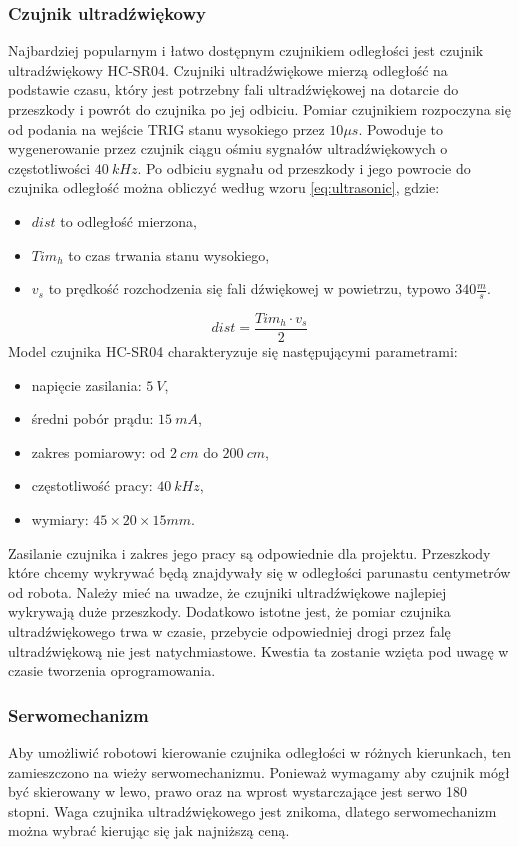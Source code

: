 \documentclass[11pt]{article}
\begin{document}
\subsubsection{Czujnik ultradźwiękowy}
Najbardziej popularnym i łatwo dostępnym czujnikiem odległości jest czujnik ultradźwiękowy HC-SR04.
Czujniki ultradźwiękowe mierzą odległość na podstawie czasu, który jest potrzebny fali ultradźwiękowej na dotarcie do przeszkody i powrót do czujnika po jej odbiciu.
Pomiar czujnikiem rozpoczyna się od podania na wejście TRIG stanu wysokiego przez $ 10 \mu s $. Powoduje to wygenerowanie przez czujnik ciągu ośmiu sygnałów ultradźwiękowych o częstotliwości $ 40\ kHz $. Po odbiciu sygnału od przeszkody i jego powrocie do czujnika odległość można obliczyć według wzoru \ref{eq:ultrasonic}, gdzie:

\begin{itemize}
	\item $ dist $ to odległość mierzona,
	\item $ Tim_h $ to czas trwania stanu wysokiego, 
	\item $ v_s $ to prędkość rozchodzenia się fali dźwiękowej w powietrzu, typowo $ 340 \frac{m}{s} $.
\end{itemize}
\begin{equation}
\label{eq:ultrasonic}
	dist = \frac{Tim_h \cdot v_s}{2}
\end{equation}
Model czujnika HC-SR04 charakteryzuje się następującymi parametrami:
\begin{itemize}
	\item napięcie zasilania: $ 5\ V $,
	\item średni pobór prądu: $ 15\ mA $,
	\item zakres pomiarowy: od $ 2\ cm $ do $ 200\ cm $,
	\item częstotliwość pracy: $ 40\ kHz $,
	\item wymiary: $ 45 \times 20 \times 15 mm $.
\end{itemize}
Zasilanie czujnika i zakres jego pracy są odpowiednie dla projektu.
Przeszkody które chcemy wykrywać będą znajdywały się w odległości parunastu centymetrów od robota.
Należy mieć na uwadze, że czujniki ultradźwiękowe najlepiej wykrywają duże przeszkody. 
Dodatkowo istotne jest, że pomiar czujnika ultradźwiękowego trwa w czasie, przebycie odpowiedniej drogi przez falę ultradźwiękową nie jest natychmiastowe.
Kwestia ta zostanie wzięta pod uwagę w czasie tworzenia oprogramowania.

\subsubsection{Serwomechanizm}
Aby umożliwić robotowi kierowanie czujnika odległości w różnych kierunkach, ten zamieszczono na wieży serwomechanizmu.
Ponieważ wymagamy aby czujnik mógł być skierowany w lewo, prawo oraz na wprost wystarczające jest serwo 180 stopni.
Waga czujnika ultradźwiękowego jest znikoma, dlatego serwomechanizm można wybrać kierując się jak najniższą ceną.
\end{document}
